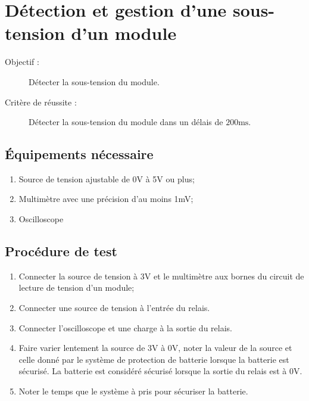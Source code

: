 
\section{Détection et gestion d'une sous-tension d'un module}

\begin{description}
	\item[Objectif :] Détecter la sous-tension du module.
	\item[Critère de réussite :] Détecter la sous-tension du module dans un délais de $200\text{ms}$.
\end{description}

\subsection*{Équipements nécessaire}
\begin{enumerate}
	\item Source de tension ajustable de 0V à 5V ou plus;
	\item Multimètre avec une précision d'au moins 1mV;
	\item Oscilloscope
\end{enumerate}	

\subsection*{Procédure de test}
\begin{enumerate}
	\item Connecter la source de tension à 3V et le multimètre aux bornes du circuit de lecture de tension d'un module;
	\item Connecter une source de tension à l'entrée du relais.
	\item Connecter l'oscilloscope et une charge à la sortie du relais.
	\item Faire varier lentement la source de 3V à 0V, noter la valeur de la source et celle donné par le système de protection de batterie lorsque la batterie est sécurisé. La batterie est considéré sécurisé lorsque la sortie du relais est à 0V. 
	\item Noter le temps que le système à pris pour sécuriser la batterie.
\end{enumerate}